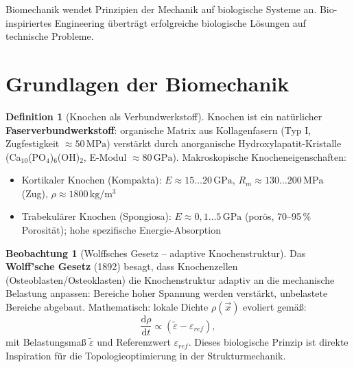 ﻿\documentclass[a4paper,12pt]{report}
\theoremstyle{definition}
\newtheorem{definition}{Definition}
\newtheorem{beobachtung}{Beobachtung}
\begin{document}
Biomechanik wendet Prinzipien der Mechanik auf biologische Systeme an.
Bio-inspiriertes Engineering überträgt erfolgreiche biologische Lösungen
auf technische Probleme.

\section{Grundlagen der Biomechanik}

\begin{definition}[Knochen als Verbundwerkstoff]
Knochen ist ein natürlicher \textbf{Faserverbundwerkstoff}:
organische Matrix aus Kollagenfasern (Typ I, Zugfestigkeit $\approx 50\,\mathrm{MPa}$)
verstärkt durch anorganische Hydroxylapatit-Kristalle
(Ca$_{10}$(PO$_4$)$_6$(OH)$_2$, E-Modul $\approx 80\,\mathrm{GPa}$).
Makroskopische Knocheneigenschaften:
\begin{itemize}
    \item[-] Kortikaler Knochen (Kompakta): $E \approx 15\ldots20\,\mathrm{GPa}$,
          $R_m \approx 130\ldots200\,\mathrm{MPa}$ (Zug), $\rho \approx 1800\,\mathrm{kg/m^3}$
    \item[-] Trabekulärer Knochen (Spongiosa): $E \approx 0{,}1\ldots5\,\mathrm{GPa}$
          (porös, 70--95\,\% Porosität); hohe spezifische Energie-Absorption
\end{itemize}
\end{definition}

\begin{beobachtung}[Wolffsches Gesetz -- adaptive Knochenstruktur]
Das \textbf{Wolff'sche Gesetz} (1892) besagt, dass Knochenzellen
(Osteoblasten/Osteoklasten) die Knochenstruktur adaptiv an die
mechanische Belastung anpassen: Bereiche hoher Spannung werden verstärkt,
unbelastete Bereiche abgebaut.
Mathematisch: lokale Dichte $\rho(\vec{x})$ evoliert gemäß:
\[
  \frac{\mathrm{d}\rho}{\mathrm{d}t} \propto (\tilde{\varepsilon} - \varepsilon_{ref}),
\]
mit Belastungsmaß $\tilde{\varepsilon}$ und Referenzwert $\varepsilon_{ref}$.
Dieses biologische Prinzip ist direkte Inspiration für die
Topologieoptimierung in der Strukturmechanik.
\end{beobachtung}
\end{document}
